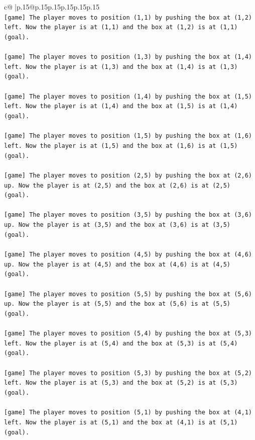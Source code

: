 \documentclass{article}
\begin{document}
{\begin{supertabular}{c@{$\;$}|p{.15\linewidth}@{}p{.15\linewidth}p{.15\linewidth}p{.15\linewidth}p{.15\linewidth}p{.15\linewidth}}
{{{\\ 
\texttt{{[}game{]} The player moves to position (1,1) by pushing the box at (1,2) left. Now the player is at (1,1) and the box at (1,2) is at (1,1) (goal).} \\
\\ 
\texttt{{[}game{]} The player moves to position (1,3) by pushing the box at (1,4) left. Now the player is at (1,3) and the box at (1,4) is at (1,3) (goal).} \\
\\ 
\texttt{{[}game{]} The player moves to position (1,4) by pushing the box at (1,5) left. Now the player is at (1,4) and the box at (1,5) is at (1,4) (goal).} \\
\\ 
\texttt{{[}game{]} The player moves to position (1,5) by pushing the box at (1,6) left. Now the player is at (1,5) and the box at (1,6) is at (1,5) (goal).} \\
\\ 
\texttt{{[}game{]} The player moves to position (2,5) by pushing the box at (2,6) up. Now the player is at (2,5) and the box at (2,6) is at (2,5) (goal).} \\
\\ 
\texttt{{[}game{]} The player moves to position (3,5) by pushing the box at (3,6) up. Now the player is at (3,5) and the box at (3,6) is at (3,5) (goal).} \\
\\ 
\texttt{{[}game{]} The player moves to position (4,5) by pushing the box at (4,6) up. Now the player is at (4,5) and the box at (4,6) is at (4,5) (goal).} \\
\\ 
\texttt{{[}game{]} The player moves to position (5,5) by pushing the box at (5,6) up. Now the player is at (5,5) and the box at (5,6) is at (5,5) (goal).} \\
\\ 
\texttt{{[}game{]} The player moves to position (5,4) by pushing the box at (5,3) left. Now the player is at (5,4) and the box at (5,3) is at (5,4) (goal).} \\
\\ 
\texttt{{[}game{]} The player moves to position (5,3) by pushing the box at (5,2) left. Now the player is at (5,3) and the box at (5,2) is at (5,3) (goal).} \\
\\ 
\texttt{{[}game{]} The player moves to position (5,1) by pushing the box at (4,1) left. Now the player is at (5,1) and the box at (4,1) is at (5,1) (goal).} \\
}}}
\end{supertabular}}
\end{document}
